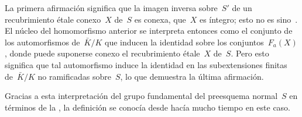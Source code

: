 La primera afirmación significa que la imagen inversa sobre~$S'$ de un
recubrimiento étale conexo~$X$ de~$S$ es conexa, \ie que~$X$ es íntegro;
esto no es sino~. El núcleo del homomorfismo anterior se
interpreta entonces como el conjunto de los automorfismos de~$\bar{K}/K$
que inducen la identidad sobre los conjuntos~$F_a(X)$,
%
donde puede suponerse conexo el recubrimiento étale~$X$ de~$S$. Pero esto
significa que tal automorfismo induce la identidad en las subextensiones
finitas de~$\bar{K}/K$ no ramificadas sobre~$S$, lo que demuestra la última
afirmación.

\begin{remarquestar}
Gracias a esta interpretación del grupo fundamental del preesquema normal~$S$
en términos de la
,
la definición se conocía desde hacía mucho tiempo en este caso.
\end{remarquestar}
